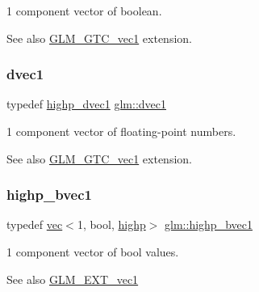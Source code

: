 1 component vector of boolean. \begin{DoxySeeAlso}{See also}
\mbox{\hyperlink{group__gtc__vec1}{G\+L\+M\+\_\+\+G\+T\+C\+\_\+vec1}} extension. 
\end{DoxySeeAlso}
\mbox{\label{group__ext__vec1_ga8d5252eec287cf34cc18a219a118f9f2}} 
\subsubsection{\texorpdfstring{dvec1}{dvec1}}
{\footnotesize\ttfamily typedef \mbox{\hyperlink{group__ext__vec1_ga51e54e6b2fe3962fc44a176eeb3e3fe6}{highp\+\_\+dvec1}} \mbox{\hyperlink{group__ext__vec1_ga8d5252eec287cf34cc18a219a118f9f2}{glm\+::dvec1}}}

1 component vector of floating-\/point numbers. \begin{DoxySeeAlso}{See also}
\mbox{\hyperlink{group__gtc__vec1}{G\+L\+M\+\_\+\+G\+T\+C\+\_\+vec1}} extension. 
\end{DoxySeeAlso}
\mbox{\label{group__ext__vec1_gac7fdd0536d878f87393132b3a7f9ef03}} 
\subsubsection{\texorpdfstring{highp\+\_\+bvec1}{highp\_bvec1}}
{\footnotesize\ttfamily typedef \mbox{\hyperlink{structglm_1_1vec}{vec}}$<$1, bool, \mbox{\hyperlink{namespaceglm_a36ed105b07c7746804d7fdc7cc90ff25ac6f7eab42eacbb10d59a58e95e362074}{highp}}$>$ \mbox{\hyperlink{group__ext__vec1_gac7fdd0536d878f87393132b3a7f9ef03}{glm\+::highp\+\_\+bvec1}}}

1 component vector of bool values.

\begin{DoxySeeAlso}{See also}
\mbox{\hyperlink{group__ext__vec1}{G\+L\+M\+\_\+\+E\+X\+T\+\_\+vec1}} 
\end{DoxySeeAlso}
\mbox{\label{group__ext__vec1_ga51e54e6b2fe3962fc44a176eeb3e3fe6}} 
